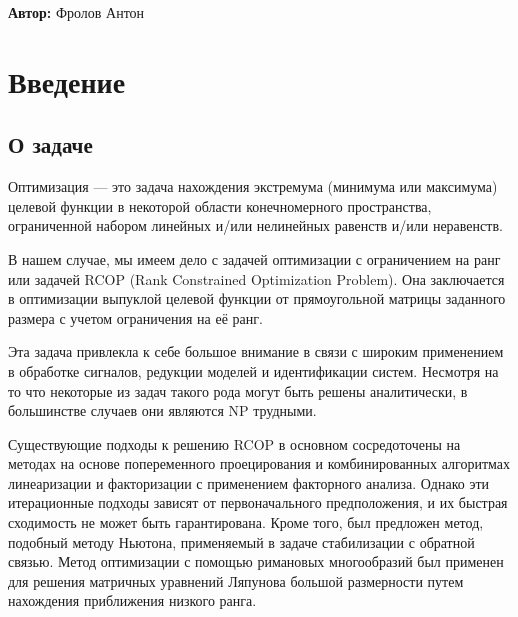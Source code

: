 \documentclass[oneside,final,14pt]{extreport} %
\begin{document}
\begin{titlepage}
	\vskip10cm
	\vskip5cm
	\begin{flushright}
		{\bf Автор:} Фролов Антон
	\end{flushright}
	\vfill
\end{titlepage}
\setcounter{page}{2} 

\tableofcontents
\chapter{Введение}
\section{О задаче}

Оптимизация — это задача нахождения экстремума (минимума или максимума) целевой функции в некоторой области конечномерного пространства, ограниченной набором линейных и/или нелинейных равенств и/или неравенств.

В нашем случае, мы имеем дело с задачей оптимизации с ограничением на ранг или задачей RCOP (Rank Constrained Optimization Problem). Она заключается в оптимизации выпуклой целевой функции от прямоугольной матрицы заданного размера с учетом ограничения на её ранг. 

Эта задача привлекла к себе большое внимание в связи с широким применением в обработке сигналов, редукции моделей и идентификации систем. Несмотря на то что некоторые из задач такого рода могут быть решены аналитически, в большинстве случаев они являются NP трудными.

Существующие подходы к решению RCOP в основном сосредоточены на методах на основе попеременного проецирования и комбинированных алгоритмах линеаризации и факторизации с применением факторного анализа. Однако эти итерационные подходы зависят от первоначального предположения, и их быстрая сходимость не может быть гарантирована. Кроме того, был предложен метод, подобный методу Ньютона, применяемый в задаче стабилизации с обратной связью. Метод оптимизации с помощью римановых многообразий был применен для решения матричных уравнений Ляпунова большой размерности путем нахождения приближения низкого ранга.
\end{document}
